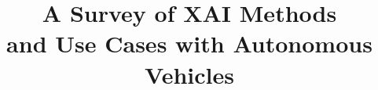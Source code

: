 \documentclass{IEEEtran}
\begin{document}
\title{A Survey of XAI Methods\\and Use Cases with Autonomous Vehicles}
\author{
    \\
}
\maketitle









\nocite{*}

 
\end{document}
